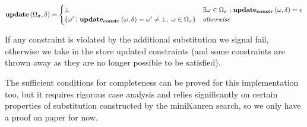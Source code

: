\[
\mathbf{update}\,(\Omega_\sigma, \delta) =
\begin{cases}
  \bot                                                 & \exists \omega \in \Omega_\sigma: \mathbf{update_{constr}}\,(\omega, \delta) = \epsilon \\
  \{ \omega' \mid \mathbf{update_{constr}}\,(\omega, \delta) = \omega' \neq \bot, \; \omega \in \Omega_\sigma \}   & \textit{otherwise}
\end{cases}
\]

If any constraint is violated by the additional substitution we signal fail, otherwise we take in the store updated constraints
(and some constraints are thrown away as they are no longer possible to be satisfied).

The sufficient conditions for completeness can be proved for this implementation too,
but it requires rigorous case analysis and relies significantly on certain properties of substitution constructed by the miniKanren search,
so we only have a proof on paper for now.
